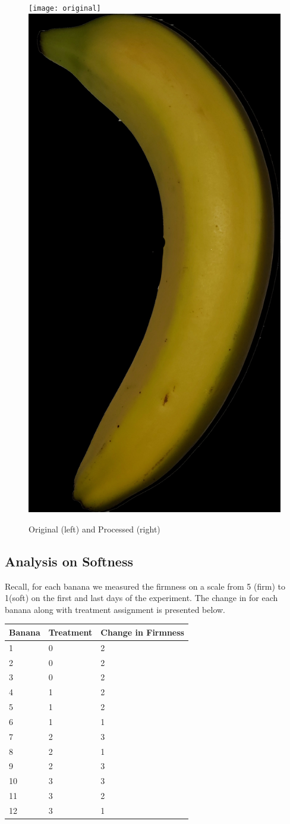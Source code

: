 \documentclass[
  12pt,
]{article}
\begin{document}
\begin{figure}[H]

{\centering \texttt{[image: original]} \includegraphics[width=0.3\linewidth,height=0.3\textheight]{processed} 

}

\caption{Original (left) and Processed (right)}\label{fig:unnamed-chunk-3}
\end{figure}

\hypertarget{analysis-on-softness}{%
\subsection{Analysis on Softness}\label{analysis-on-softness}}

Recall, for each banana we measured the firmness on a scale from 5
(firm) to 1(soft) on the first and last days of the experiment. The
change in for each banana along with treatment assignment is presented
below.

\begin{longtable}[]{@{}lll@{}}
\toprule()
Banana & Treatment & Change in Firmness \\
\midrule()
\endhead
1 & 0 & 2 \\
2 & 0 & 2 \\
3 & 0 & 2 \\
4 & 1 & 2 \\
5 & 1 & 2 \\
6 & 1 & 1 \\
7 & 2 & 3 \\
8 & 2 & 1 \\
9 & 2 & 3 \\
10 & 3 & 3 \\
11 & 3 & 2 \\
12 & 3 & 1 \\
\bottomrule()
\end{longtable}
\end{document}
